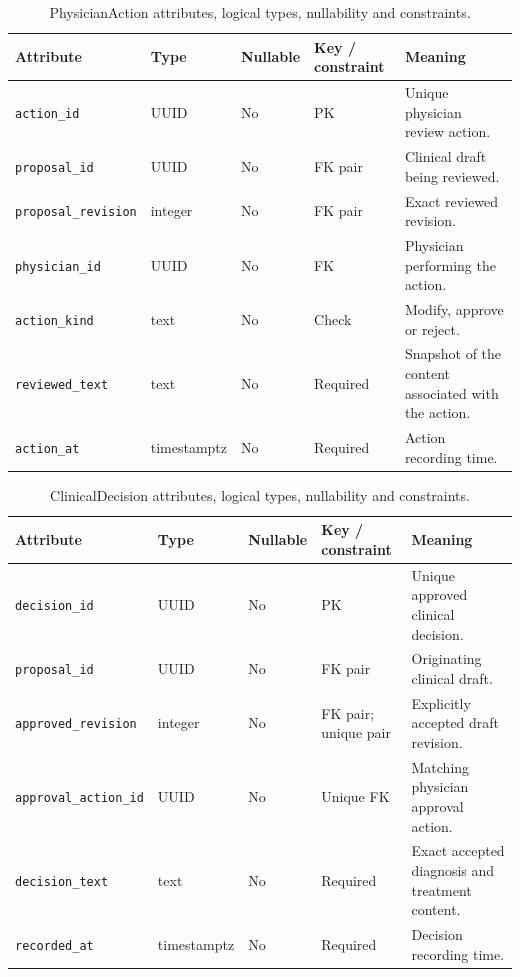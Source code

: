 \begin{table}[htbp]
\setlength{\tabcolsep}{5pt}
\centering
\small
\caption{PhysicianAction attributes, logical types, nullability and constraints.}
\label{tab:kashaf:dict-physicianaction}
\begin{tabular}{|p{}|p{}|p{}|p{}|p{}|}
\hline
Attribute & Type & Nullable & Key / constraint & Meaning \\ \hline
\texttt{action\_id} & UUID & No & PK & Unique physician review action. \\ \hline
\texttt{proposal\_id} & UUID & No & FK pair & Clinical draft being reviewed. \\ \hline
\texttt{proposal\_revision} & integer & No & FK pair & Exact reviewed revision. \\ \hline
\texttt{physician\_id} & UUID & No & FK & Physician performing the action. \\ \hline
\texttt{action\_kind} & text & No & Check & Modify, approve or reject. \\ \hline
\texttt{reviewed\_text} & text & No & Required & Snapshot of the content associated with the action. \\ \hline
\texttt{action\_at} & timestamptz & No & Required & Action recording time. \\ \hline
\end{tabular}
\end{table}

\begin{table}[htbp]
\setlength{\tabcolsep}{5pt}
\centering
\small
\caption{ClinicalDecision attributes, logical types, nullability and constraints.}
\label{tab:kashaf:dict-clinicaldecision}
\begin{tabular}{|p{}|p{}|p{}|p{}|p{}|}
\hline
Attribute & Type & Nullable & Key / constraint & Meaning \\ \hline
\texttt{decision\_id} & UUID & No & PK & Unique approved clinical decision. \\ \hline
\texttt{proposal\_id} & UUID & No & FK pair & Originating clinical draft. \\ \hline
\texttt{approved\_revision} & integer & No & FK pair; unique pair & Explicitly accepted draft revision. \\ \hline
\texttt{approval\_action\_id} & UUID & No & Unique FK & Matching physician approval action. \\ \hline
\texttt{decision\_text} & text & No & Required & Exact accepted diagnosis and treatment content. \\ \hline
\texttt{recorded\_at} & timestamptz & No & Required & Decision recording time. \\ \hline
\end{tabular}
\end{table}

